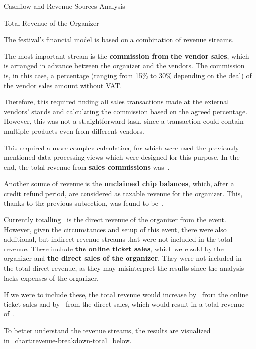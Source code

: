 \begin{section}{Cashflow and Revenue Sources Analysis}
	\pagebreak[4]

	\begin{subsection}{Total Revenue of the Organizer}
		\label{subsec:analysis-total-revenue}

		The festival's financial model is based on a combination of revenue streams.

		The most important stream is the \textbf{commission from the vendor sales}, which is arranged in advance between the organizer and the vendors.
		The commission is, in this case, a percentage (ranging from 15\% to 30\% depending on the deal) of the vendor sales amount without VAT\@.

		Therefore, this required finding all sales transactions made at the external vendors' stands and calculating the commission based on the agreed percentage.
		However, this was not a straightforward task, since a transaction could contain multiple products even from different vendors.

		This required a more complex calculation, for which were used the previously mentioned data processing views which were designed for this purpose.
		In the end, the total revenue from \textbf{sales commissions} was~.

		Another source of revenue is the \textbf{unclaimed chip balances}, which, after a credit refund period, are considered as taxable revenue for the organizer.
		This, thanks to the previous subsection, was found to be~.

		Currently totalling~ is the direct revenue of the organizer from the event.
		However, given the circumstances and setup of this event, there were also additional, but indirect revenue streams that were not included in the total revenue.
		These include \textbf{the online ticket sales}, which were sold by the organizer and \textbf{the direct sales of the organizer}.
		They were not included in the total direct revenue, as they may misinterpret the results since the analysis lacks expenses of the organizer.

		If we were to include these, the total revenue would increase by~ from the online ticket sales and by~ from the direct sales, which would result in a total revenue of~.

		To better understand the revenue streams, the results are visualized in~\autoref{chart:revenue-breakdown-total}~below.


\end{subsection}
\end{section}
